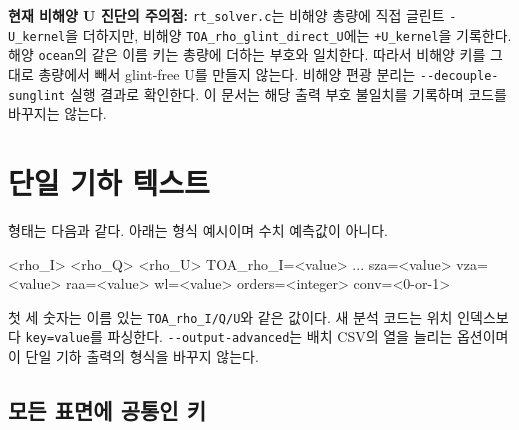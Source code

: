 \textbf{현재 비해양 U 진단의 주의점:} \texttt{rt\_\allowbreak{}solver.\allowbreak{}c}는 비해양 총량에 직접 글린트 \texttt{-U\_\allowbreak{}kernel}을 더하지만, 비해양 \texttt{TOA\_\allowbreak{}rho\_\allowbreak{}glint\_\allowbreak{}direct\_\allowbreak{}U}에는 \texttt{+U\_\allowbreak{}kernel}을 기록한다. 해양 \texttt{ocean}의 같은 이름 키는 총량에 더하는 부호와 일치한다. 따라서 비해양 키를 그대로 총량에서 빼서 glint-free U를 만들지 않는다. 비해양 편광 분리는 \texttt{-\allowbreak{}-\allowbreak{}decouple-\allowbreak{}sunglint} 실행 결과로 확인한다. 이 문서는 해당 출력 부호 불일치를 기록하며 코드를 바꾸지는 않는다.

\section{단일 기하 텍스트}
\label{sec:auto:05_output_formats:4}
형태는 다음과 같다. 아래는 형식 예시이며 수치 예측값이 아니다.


\begin{ManualCode}
<rho_I> <rho_Q> <rho_U>  TOA_rho_I=<value> ... sza=<value> vza=<value> raa=<value> wl=<value> orders=<integer> conv=<0-or-1>
\end{ManualCode}

첫 세 숫자는 이름 있는 \texttt{TOA\_\allowbreak{}rho\_\allowbreak{}I/\allowbreak{}Q/\allowbreak{}U}와 같은 값이다. 새 분석 코드는 위치 인덱스보다 \texttt{key=\allowbreak{}value}를 파싱한다. \texttt{-\allowbreak{}-\allowbreak{}output-\allowbreak{}advanced}는 배치 CSV의 열을 늘리는 옵션이며 이 단일 기하 출력의 형식을 바꾸지 않는다.

\subsection{모든 표면에 공통인 키}
\label{sec:auto:05_output_formats:4.1}

